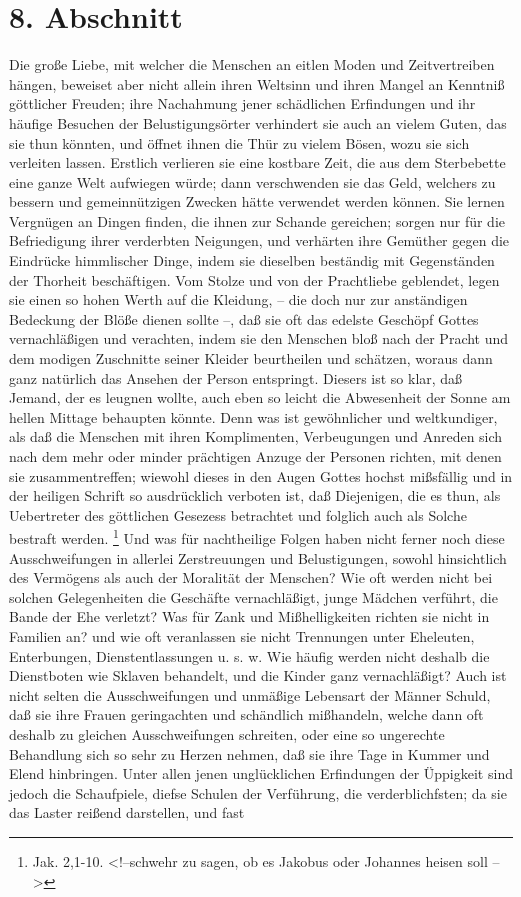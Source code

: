 \section{8. Abschnitt}

Die große Liebe, mit welcher die Menschen an eitlen Moden und Zeitvertreiben hängen, beweiset aber nicht allein ihren Weltsinn und ihren Mangel an Kenntniß göttlicher Freuden; ihre Nachahmung jener schädlichen Erfindungen und ihr häufige Besuchen der Belustigungsörter verhindert sie auch an vielem Guten, das sie thun könnten, und öffnet ihnen die Thür zu vielem Bösen, wozu sie sich verleiten lassen. Erstlich verlieren sie eine kostbare Zeit, die aus dem Sterbebette eine ganze Welt aufwiegen würde; dann verschwenden sie das Geld, welchers zu bessern und gemeinnützigen Zwecken hätte verwendet werden können. Sie lernen Vergnügen an Dingen finden, die ihnen zur Schande gereichen; sorgen nur für die Befriedigung ihrer verderbten Neigungen, und verhärten ihre Gemüther gegen die Eindrücke himmlischer Dinge, indem sie dieselben beständig mit Gegenständen der Thorheit beschäftigen. Vom Stolze und von der Prachtliebe geblendet, legen sie einen so hohen Werth auf die Kleidung, -- die doch nur zur anständigen Bedeckung der Blöße dienen sollte --, daß sie oft das edelste Geschöpf Gottes vernachläßigen und verachten, indem sie den Menschen bloß nach der Pracht und dem modigen Zuschnitte seiner Kleider beurtheilen und schätzen, woraus dann ganz natürlich das Ansehen der Person entspringt. Diesers ist so klar, daß Jemand, der es leugnen wollte, auch eben so leicht die Abwesenheit der Sonne am hellen Mittage behaupten könnte. Denn was ist gewöhnlicher und weltkundiger, als daß die Menschen mit ihren Komplimenten, Verbeugungen und Anreden sich nach dem mehr oder minder prächtigen Anzuge der Personen richten, mit denen sie zusammentreffen; wiewohl dieses in den Augen Gottes hochst mißsfällig und in der heiligen Schrift so ausdrücklich verboten ist, daß Diejenigen, die es thun, als Uebertreter des göttlichen Gesezess betrachtet und folglich auch als Solche bestraft werden. \footnote{Jak. 2,1-10. <!--schwehr zu sagen, ob es Jakobus oder Johannes heisen soll -->} Und was für nachtheilige Folgen haben nicht ferner noch diese Ausschweifungen in allerlei Zerstreuungen und Belustigungen, sowohl hinsichtlich des Vermögens als auch der Moralität der Menschen? Wie oft werden nicht bei solchen Gelegenheiten die Geschäfte vernachläßigt, junge Mädchen verführt, die Bande der Ehe verletzt? Was für Zank und Mißhelligkeiten richten sie nicht in Familien an? und wie oft veranlassen sie nicht Trennungen unter Eheleuten, Enterbungen, Dienstentlassungen u. s. w. Wie häufig werden nicht deshalb die Dienstboten wie Sklaven behandelt, und die Kinder ganz vernachläßigt? Auch ist nicht selten die Ausschweifungen und unmäßige Lebensart der Männer Schuld, daß sie ihre Frauen geringachten und schändlich mißhandeln, welche dann oft deshalb zu gleichen Ausschweifungen schreiten, oder eine so ungerechte Behandlung sich so sehr zu Herzen nehmen, daß sie ihre Tage in Kummer und Elend hinbringen. Unter allen jenen unglücklichen Erfindungen der Üppigkeit sind jedoch die Schaufpiele, diefse Schulen der Verführung, die verderblichfsten; da sie das Laster reißend darstellen, und fast 